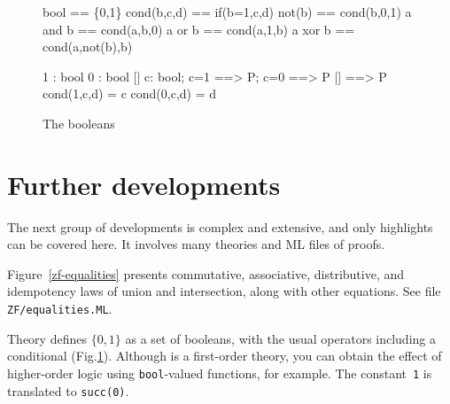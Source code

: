 \begin{figure}
%
\begin{ttbox}
       bool == \{0,1\}
       cond(b,c,d) == if(b=1,c,d)
        not(b)  == cond(b,0,1)
        a and b == cond(a,b,0)
         a or b  == cond(a,1,b)
        a xor b == cond(a,not(b),b)

        1 : bool
        0 : bool
          [| c: bool;  c=1 ==> P;  c=0 ==> P |] ==> P
         cond(1,c,d) = c
         cond(0,c,d) = d
\end{ttbox}
\caption{The booleans} \label{zf-bool}
\end{figure}


\section{Further developments}
The next group of developments is complex and extensive, and only
highlights can be covered here.  It involves many theories and ML files of
proofs. 

Figure~\ref{zf-equalities} presents commutative, associative, distributive,
and idempotency laws of union and intersection, along with other equations.
See file {\tt ZF/equalities.ML}.

Theory  defines $\{0,1\}$ as a set of booleans, with the
usual operators including a conditional (Fig.\ts\ref{zf-bool}).  Although
{\ZF} is a first-order theory, you can obtain the effect of higher-order
logic using {\tt bool}-valued functions, for example.  The constant~{\tt1}
is translated to {\tt succ(0)}.

